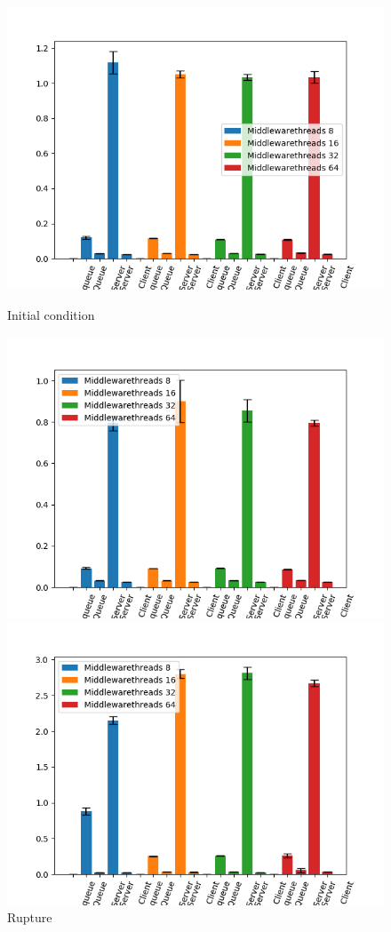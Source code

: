 \documentclass[11pt,a4paper]{article}
\begin{document}
\begin{figure}[!ht] 
  \label{ fig7} 
  \begin{minipage}[b]{0.5\linewidth}
    \centering
    \includegraphics[width=0.7\linewidth]{img/exp3_1/exp3_1_mw_percentile_plots_writes_0__vc_1.png} 
    \caption{Initial condition} 
    \vspace{4ex}
  \end{minipage}%
  \begin{minipage}[b]{0.5\linewidth}
    \centering
    \includegraphics[width=0.7\linewidth]{img/exp3_1/exp3_1_mw_percentile_plots_writes_1__vc_1.png} 
    \caption{Rupture} 
    \vspace{4ex}
  \end{minipage} 
    \begin{minipage}[b]{0.5\linewidth}
    \centering
    \includegraphics[width=0.7\linewidth]{img/exp3_1/exp3_1_mw_percentile_plots_writes_0__vc_2.png} 

\end{minipage}
\end{figure}
\end{document}
